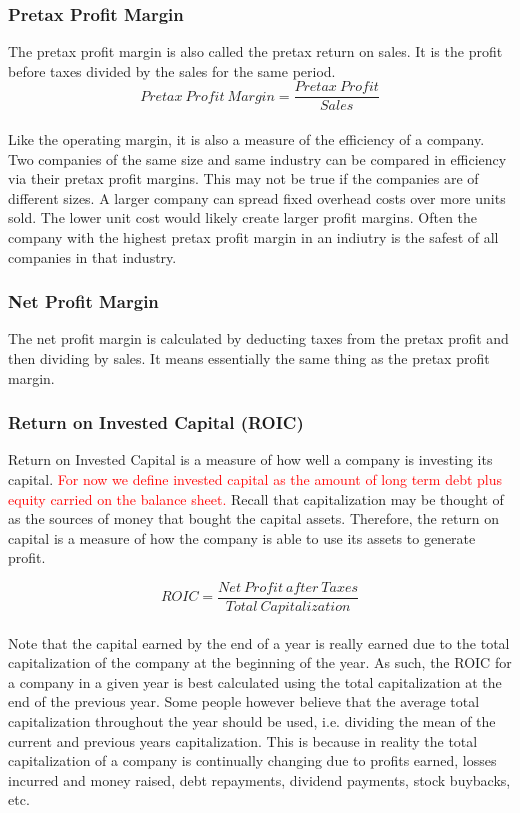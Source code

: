 \documentclass{article}
\begin{document}
\subsubsection{Pretax Profit Margin}
The pretax profit margin is also called the pretax return on sales. It is the profit before taxes divided by the sales for the same period. 
\begin{equation}
    Pretax\: Profit\: Margin = \frac{Pretax\: Profit}{Sales}
\end{equation}\\


Like the operating margin, it is also a measure of the efficiency of a company. Two companies of the same size and same industry can be compared in efficiency via their pretax profit margins. This may not be true if the companies are of different sizes. A larger company can spread fixed overhead costs over more units sold. The lower unit cost would likely create larger profit margins. Often the company with the highest pretax profit margin in an indiutry is the safest of all companies in that industry. 

\subsubsection{Net Profit Margin}
The net profit margin is calculated by deducting taxes from the pretax profit and then dividing by sales. It means essentially the same thing as the pretax profit margin. 

\subsubsection{Return on Invested Capital (ROIC)}
Return on Invested Capital is a measure of how well a company is investing its capital. \textcolor{red}{For now we define invested capital as the amount of long term debt plus equity carried on the balance sheet.} Recall that capitalization may be thought of as the sources of money that bought the capital assets. Therefore, the return on capital is a measure of how the company is able to use its assets to generate profit. 

 \begin{equation}
    ROIC = \frac{Net\: Profit\: after\: Taxes}{Total\: Capitalization}
\end{equation}\\

Note that the capital earned by the end of a year is really earned due to the total capitalization of the company at the beginning of the year. As such, the ROIC for a company in a given year is best calculated using the total capitalization at the end of the previous year. Some people however believe that the average total capitalization throughout the year should be used, i.e. dividing the mean of the current and previous years capitalization. This is because in reality the total capitalization of a company is continually changing due to profits earned, losses incurred and money raised, debt repayments, dividend payments, stock buybacks, etc. 
\end{document}
